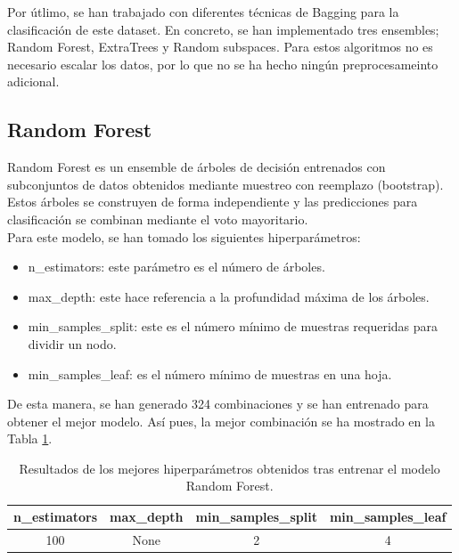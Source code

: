 \documentclass[12pt,letterpaper]{article}
\begin{document}
Por útlimo, se han trabajado con diferentes técnicas de Bagging para la clasificación de este dataset. En concreto, se han implementado tres ensembles; Random Forest, ExtraTrees y Random subspaces. Para estos algoritmos no es necesario escalar los datos, por lo que no se ha hecho ningún preprocesameinto adicional.

\subsection{Random Forest}
Random Forest es un ensemble de árboles de decisión entrenados con subconjuntos de datos obtenidos mediante muestreo con reemplazo (bootstrap).\\
Estos árboles se construyen de forma independiente y las predicciones para clasificación se combinan mediante el voto mayoritario.\\
Para este modelo, se han tomado los siguientes hiperparámetros:
\begin{itemize}
    \item n\_estimators: este parámetro es el número de árboles.
    \item max\_depth: este hace referencia a la profundidad máxima de los árboles.
    \item min\_samples\_split: este es el número mínimo de muestras requeridas para dividir un nodo.
    \item min\_samples\_leaf: es el número mínimo de muestras en una hoja.
\end{itemize}

De esta manera, se han generado 324 combinaciones y se han entrenado para obtener el mejor modelo. Así pues, la mejor combinación se ha mostrado en la Tabla \ref{tab:hiper_RF}.
\begin{table}[H]
    \centering
    \begin{tabular}{cccc}
    \hline
    \textbf{n\_estimators} &  \textbf{max\_depth} & \textbf{min\_samples\_split} & \textbf{min\_samples\_leaf} \\ \hline
    100 & None & 2 & 4 \\ \hline
    \end{tabular}
    \caption{Resultados de los mejores hiperparámetros obtenidos tras entrenar el modelo Random Forest.}
    \label{tab:hiper_RF}
\end{table}
\end{document}

